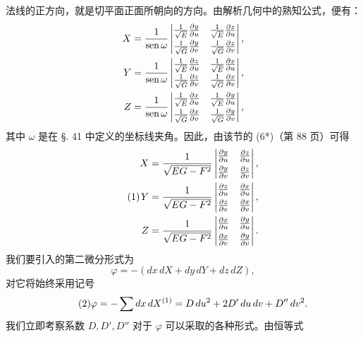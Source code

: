 法线的正方向，就是切平面正面所朝向的方向。由解析几何中的熟知公式，便有：
\[
\begin{aligned}
X&=\frac{1}{\operatorname{sen}\omega}
\left|\begin{matrix}\frac{1}{\sqrt E}\frac{\partial y}{\partial u}&
       \frac{1}{\sqrt E}\frac{\partial z}{\partial u}\\[0.35em]
       \frac{1}{\sqrt G}\frac{\partial y}{\partial v}&
       \frac{1}{\sqrt G}\frac{\partial z}{\partial v}\end{matrix}\right|,\\
Y&=\frac{1}{\operatorname{sen}\omega}
\left|\begin{matrix}\frac{1}{\sqrt E}\frac{\partial z}{\partial u}&
       \frac{1}{\sqrt E}\frac{\partial x}{\partial u}\\[0.35em]
       \frac{1}{\sqrt G}\frac{\partial z}{\partial v}&
       \frac{1}{\sqrt G}\frac{\partial x}{\partial v}\end{matrix}\right|,\\
Z&=\frac{1}{\operatorname{sen}\omega}
\left|\begin{matrix}\frac{1}{\sqrt E}\frac{\partial x}{\partial u}&
       \frac{1}{\sqrt E}\frac{\partial y}{\partial u}\\[0.35em]
       \frac{1}{\sqrt G}\frac{\partial x}{\partial v}&
       \frac{1}{\sqrt G}\frac{\partial y}{\partial v}\end{matrix}\right|,
\end{aligned}
\]
其中 \(\omega\) 是在 \S. 41 中定义的坐标线夹角。因此，由该节的 (6*)（第 88 页）可得
\begin{equation}\tag{1}
\begin{aligned}
X&=\frac{1}{\sqrt{EG-F^2}}
\left|\begin{matrix}\frac{\partial y}{\partial u}&\frac{\partial z}{\partial u}\\[0.35em]
       \frac{\partial y}{\partial v}&\frac{\partial z}{\partial v}\end{matrix}\right|,\\
Y&=\frac{1}{\sqrt{EG-F^2}}
\left|\begin{matrix}\frac{\partial z}{\partial u}&\frac{\partial x}{\partial u}\\[0.35em]
       \frac{\partial z}{\partial v}&\frac{\partial x}{\partial v}\end{matrix}\right|,\\
Z&=\frac{1}{\sqrt{EG-F^2}}
\left|\begin{matrix}\frac{\partial x}{\partial u}&\frac{\partial y}{\partial u}\\[0.35em]
       \frac{\partial x}{\partial v}&\frac{\partial y}{\partial v}\end{matrix}\right|.
\end{aligned}
\end{equation}
我们要引入的第二微分形式为
\[
 \varphi=-(dx\,dX+dy\,dY+dz\,dZ),
\]
对它将始终采用记号
\begin{equation}\tag{2}
 \varphi=-\sum dx\,dX\srcfnmark{1}=D\,du^2+2D'\,du\,dv+D''\,dv^2.
\end{equation}
我们立即考察系数 \(D,D',D''\) 对于 \(\varphi\) 可以采取的各种形式。由恒等式
